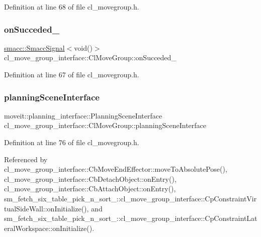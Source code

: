 Definition at line 68 of file cl\+\_\+movegroup.\+h.

\mbox{\label{classcl__move__group__interface_1_1ClMoveGroup_aefc24baaaed9ac7615f4dca20b8a077e}} 
\subsubsection{\texorpdfstring{on\+Succeded\+\_\+}{onSucceded\_}}
{\footnotesize\ttfamily \hyperlink{classsmacc_1_1SmaccSignal}{smacc\+::\+Smacc\+Signal}$<$void()$>$ cl\+\_\+move\+\_\+group\+\_\+interface\+::\+Cl\+Move\+Group\+::on\+Succeded\+\_\+\hspace{0.3cm}{\ttfamily [private]}}



Definition at line 67 of file cl\+\_\+movegroup.\+h.

\mbox{\label{classcl__move__group__interface_1_1ClMoveGroup_a11bfab580f36e2ad32c9b37d6f58f44c}} 
\subsubsection{\texorpdfstring{planning\+Scene\+Interface}{planningSceneInterface}}
{\footnotesize\ttfamily moveit\+::planning\+\_\+interface\+::\+Planning\+Scene\+Interface cl\+\_\+move\+\_\+group\+\_\+interface\+::\+Cl\+Move\+Group\+::planning\+Scene\+Interface}



Definition at line 76 of file cl\+\_\+movegroup.\+h.



Referenced by cl\+\_\+move\+\_\+group\+\_\+interface\+::\+Cb\+Move\+End\+Effector\+::move\+To\+Absolute\+Pose(), cl\+\_\+move\+\_\+group\+\_\+interface\+::\+Cb\+Detach\+Object\+::on\+Entry(), cl\+\_\+move\+\_\+group\+\_\+interface\+::\+Cb\+Attach\+Object\+::on\+Entry(), sm\+\_\+fetch\+\_\+six\+\_\+table\+\_\+pick\+\_\+n\+\_\+sort\+\_\+::cl\+\_\+move\+\_\+group\+\_\+interface\+::\+Cp\+Constraint\+Virtual\+Side\+Wall\+::on\+Initialize(), and sm\+\_\+fetch\+\_\+six\+\_\+table\+\_\+pick\+\_\+n\+\_\+sort\+\_\+::cl\+\_\+move\+\_\+group\+\_\+interface\+::\+Cp\+Constraint\+Lateral\+Workspace\+::on\+Initialize().

